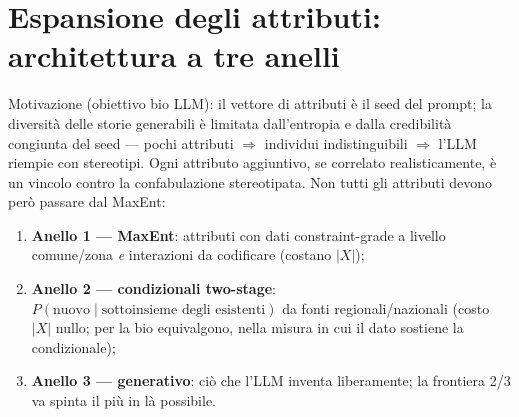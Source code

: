 \documentclass[11pt,a4paper]{article}
\begin{document}
\section{Espansione degli attributi: architettura a tre anelli}
\label{sec:anelli}
Motivazione (obiettivo bio LLM): il vettore di attributi \`e il seed del
prompt; la diversit\`a delle storie generabili \`e limitata dall'entropia e
dalla credibilit\`a congiunta del seed --- pochi attributi $\Rightarrow$
individui indistinguibili $\Rightarrow$ l'LLM riempie con stereotipi.
Ogni attributo aggiuntivo, se correlato realisticamente, \`e un vincolo
contro la confabulazione stereotipata. Non tutti gli attributi devono per\`o
passare dal MaxEnt:
\begin{enumerate}[leftmargin=*,itemsep=1pt]
  \item \textbf{Anello 1 --- MaxEnt}: attributi con dati constraint-grade a
  livello comune/zona \emph{e} interazioni da codificare (costano $|X|$);
  \item \textbf{Anello 2 --- condizionali two-stage}: $P(\text{nuovo}\mid
  \text{sottoinsieme degli esistenti})$ da fonti regionali/nazionali
  (costo $|X|$ nullo; per la bio equivalgono, nella misura in cui il dato
  sostiene la condizionale);
  \item \textbf{Anello 3 --- generativo}: ci\`o che l'LLM inventa
  liberamente; la frontiera 2/3 va spinta il pi\`u in l\`a possibile.
\end{enumerate}
\end{document}
